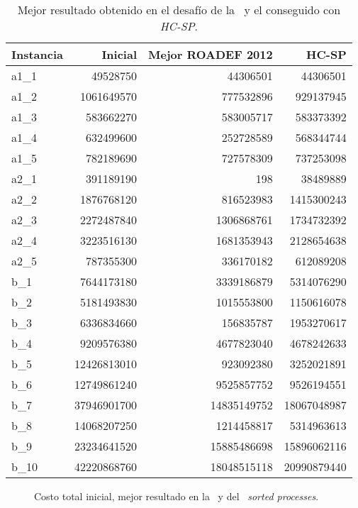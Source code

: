 \documentclass[../informe2.tex]{subfiles}
\begin{document}
\clearpage

\begin{table}[ht!]
	\small
\centering
\begin{tabular}{@{}lrrr@{}}
\toprule
Instancia & Inicial & Mejor ROADEF 2012 & HC-SP \\ \midrule
a1\_1  & 49528750               & 44306501            & 44306501              \\
a1\_2  & 1061649570             & 777532896           & 929137945             \\
a1\_3  & 583662270              & 583005717           & 583373392             \\
a1\_4  & 632499600              & 252728589           & 568344744             \\
a1\_5  & 782189690              & 727578309           & 737253098             \\
a2\_1  & 391189190              & 198                 & 38489889              \\
a2\_2  & 1876768120             & 816523983           & 1415300243            \\
a2\_3  & 2272487840             & 1306868761          & 1734732392            \\
a2\_4  & 3223516130             & 1681353943          & 2128654638            \\
a2\_5  & 787355300              & 336170182           & 612089208             \\
b\_1   & 7644173180             & 3339186879          & 5314076290            \\
b\_2   & 5181493830             & 1015553800          & 1150616078            \\
b\_3   & 6336834660             & 156835787           & 1953270617            \\
b\_4   & 9209576380             & 4677823040          & 4678242633            \\
b\_5   & 12426813010            & 923092380           & 3252021891            \\
b\_6   & 12749861240            & 9525857752          & 9526194551            \\
b\_7   & 37946901700            & 14835149752         & 18067048987           \\
b\_8   & 14068207250            & 1214458817          & 5314963613            \\
b\_9   & 23234641520            & 15885486698         & 15896062116           \\
b\_10  & 42220868760            & 18048515118         & 20990879440           \\ \bottomrule
\end{tabular}
\caption{\small Mejor resultado obtenido en el desafío de la \roadef\ y el conseguido con \textit{HC-SP}.}\label{tabla:comparative-with-best-roadef}
\end{table}

\begin{figure}[ht!]
	\caption{\small Costo total inicial, mejor resultado en la \roadef\ y del \hillc\ \textit{sorted processes}.}\label{fig:comparativa-hc-best-challenge}
\end{figure}
\end{document}
